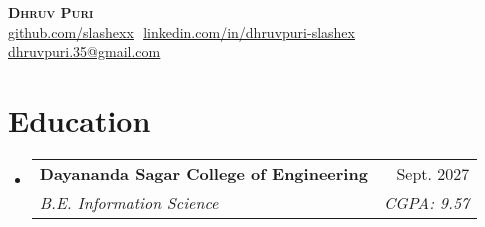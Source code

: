 \documentclass[letterpaper,11pt]{article}
\makeatletter
\newcommand{\resumeSubheading}[4]{
  \vspace{-2pt}\item
    \begin{tabular*}{0.97\textwidth}[t]{l@{\extracolsep{\fill}}r}
      \textbf{#1} & #2 \\
      \textit{\small#3} & \textit{\small #4} \\
    \end{tabular*}\vspace{-7pt}
}
\newcommand{\resumeSubHeadingListStart}{\begin{itemize}[leftmargin=0.15in, label={}]}
\newcommand{\resumeSubHeadingListEnd}{\end{itemize}}
\makeatother
\begin{document}
\begin{flushright}
  \color{gray}
  \item
\end{flushright}

\vspace{-5pt}

\begin{center}
    \textbf{\Huge \scshape Dhruv Puri} \\ \vspace{8pt}
    \small 
    \href{https://github.com/slashexx}{\underline{github.com/slashexx}} $  $
    \href{https://linkedin.com/in/dhruvpuri-slashex}{\underline{linkedin.com/in/dhruvpuri-slashex}} $  $
    \href{mailto:dhruvpuri.35@gmail.com}
    {\underline{dhruvpuri.35@gmail.com}}
\end{center}

\section{Education}
  \resumeSubHeadingListStart
  
    \resumeSubheading
      {Dayananda Sagar College of Engineering}{Sept. 2027}
      {B.E. Information Science}{CGPA: 9.57}
      



  \resumeSubHeadingListEnd
\end{document}
